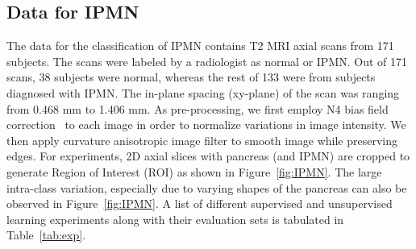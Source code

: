 \documentclass[journal]{IEEEtran}
\begin{document}
\subsection{Data for IPMN}
The data for the classification of IPMN contains T2 MRI axial scans from 171 subjects. The scans were labeled by a radiologist as normal or IPMN. Out of 171 scans, 38 subjects were normal, whereas the rest of 133 were from subjects diagnosed with IPMN. The in-plane spacing (xy-plane) of the scan was ranging from 0.468 mm to 1.406 mm. As pre-processing, we first employ N4 bias field correction~\cite{tustison2010n4itk} to each image in order to normalize variations in image intensity. We then apply curvature anisotropic image filter to smooth image while preserving edges. For experiments, 2D axial slices with pancreas (and IPMN) are cropped to generate Region of Interest (ROI) as shown in Figure~\ref{fig:IPMN}. The large intra-class variation, especially due to varying shapes of the pancreas can also be observed in Figure~\ref{fig:IPMN}. A list of different supervised and unsupervised learning experiments along with their evaluation sets is tabulated in Table~\ref{tab:exp}.
\end{document}
